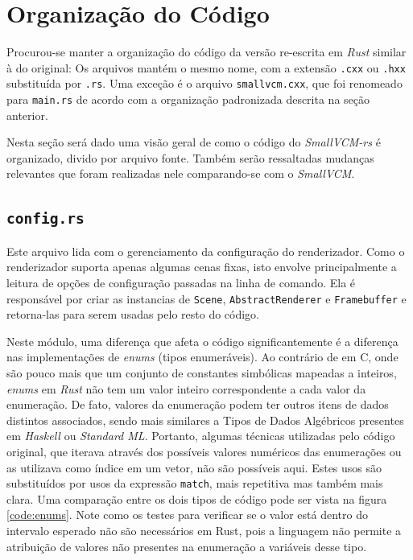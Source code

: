 \documentclass[tg]{mdtufsm}
\def\Cpp{{C\nolinebreak[4]\raisebox{.20ex}{\small\bf++}}}
\begin{document}
\section{Organização do Código}

Procurou-se manter a organização do código da versão re-escrita em \emph{Rust} similar à do original: Os arquivos mantém o mesmo nome, com a extensão \texttt{.cxx} ou \texttt{.hxx} substituída por \texttt{.rs}. Uma exceção é o arquivo \texttt{smallvcm.cxx}, que foi renomeado para \texttt{main.rs} de acordo com a organização padronizada descrita na seção anterior.

Nesta seção será dado uma visão geral de como o código do \emph{SmallVCM-rs} é organizado, divido por arquivo fonte. Também serão ressaltadas mudanças relevantes que foram realizadas nele comparando-se com o \emph{SmallVCM}.

\subsection{\texttt{config.rs}}

Este arquivo lida com o gerenciamento da configuração do renderizador. Como o renderizador suporta apenas algumas cenas fixas, isto envolve principalmente a leitura de opções de configuração passadas na linha de comando. Ela é responsável por criar as instancias de \texttt{Scene}, \texttt{AbstractRenderer} e \texttt{Framebuffer} e retorna-las para serem usadas pelo resto do código.

Neste módulo, uma diferença que afeta o código significantemente é a diferença nas implementações de \emph{enums} (tipos enumeráveis). Ao contrário de em \Cpp, onde são pouco mais que um conjunto de constantes simbólicas mapeadas a inteiros, \emph{enums} em \emph{Rust} não tem um valor inteiro correspondente a cada valor da enumeração. De fato, valores da enumeração podem ter outros itens de dados distintos associados, sendo mais similares a Tipos de Dados Algébricos presentes em \emph{Haskell} ou \emph{Standard ML}. Portanto, algumas técnicas utilizadas pelo código original, que iterava através dos possíveis valores numéricos das enumerações ou as utilizava como índice em um vetor, não são possíveis aqui. Estes usos são substituídos por usos da expressão \texttt{match}, mais repetitiva mas também mais clara. Uma comparação entre os dois tipos de código pode ser vista na figura \ref{code:enums}. Note como os testes para verificar se o valor está dentro do intervalo esperado não são necessários em Rust, pois a linguagem não permite a atribuição de valores não presentes na enumeração a variáveis desse tipo.
\end{document}
